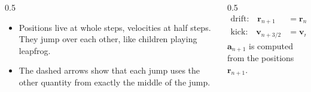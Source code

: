 \begin{frame}
  \vspace*{1mm}
  \begin{columns}[T]
    \begin{column}{0.5\textwidth}
      \begin{itemize}
        \item Positions live at whole steps, velocities at half steps. They jump over each other, like children playing leapfrog.
        \item The dashed arrows show that each jump uses the other quantity from exactly the middle of the jump.
      \end{itemize}
    \end{column}
    \begin{column}{0.5\textwidth}
      \begin{align*}
        \text{drift:} \quad \mathbf{r}_{n+1} &= \mathbf{r}_n + \mathbf{v}_{n+1/2} \, \Delta t \\
        \text{kick:} \quad \mathbf{v}_{n+3/2} &= \mathbf{v}_{n+1/2} + \mathbf{a}_{n+1} \, \Delta t
      \end{align*}
      {\small $\mathbf{a}_{n+1}$ is computed from the positions $\mathbf{r}_{n+1}$.}
    \end{column}
  \end{columns}
\end{frame}


